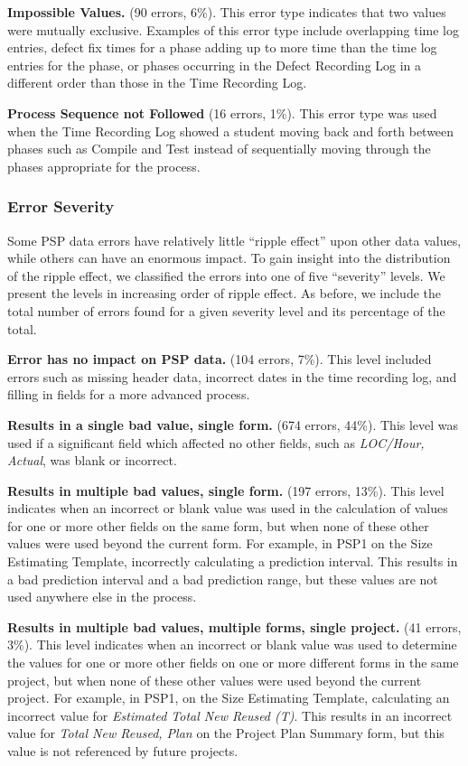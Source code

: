 {\bf Impossible Values.} (90 errors, 6\%). This error type indicates that
two values were mutually exclusive.  Examples of this error type include
overlapping time log entries, defect fix times for a phase adding up to
more time than the time log entries for the phase, or phases occurring in
the Defect Recording Log in a different order than those in the Time
Recording Log.
      
{\bf Process Sequence not Followed} (16 errors, 1\%).  This error type was
used when the Time Recording Log showed a student moving back and forth
between phases such as Compile and Test instead of sequentially moving
through the phases appropriate for the process.\newline


\subsubsection{Error Severity}

Some PSP data errors have relatively little ``ripple effect'' upon other
data values, while others can have an enormous impact. To gain insight into
the distribution of the ripple effect, we classified the errors into one of
five ``severity'' levels.  We present the levels in increasing order
of ripple effect.  As before, we include the total number of errors
found for a given severity level and its percentage of the total.


{\bf Error has no impact on PSP data.} (104 errors, 7\%). This level
included errors such as missing header data, incorrect dates in the time
recording log, and filling in fields for a more advanced process.
        
{\bf Results in a single bad value, single form.} (674 errors, 44\%).  This
level was used if a significant field which affected no other fields, such
as {\it LOC/Hour, Actual}, was blank or incorrect.
        
{\bf Results in multiple bad values, single form.} (197 errors, 13\%).
This level indicates when an incorrect or blank value was used in the
calculation of values for one or more other fields on the same form, but
when none of these other values were used beyond the current form.  For
example, in PSP1 on the Size Estimating Template, incorrectly calculating a
prediction interval.  This results in a bad prediction interval and a bad
prediction range, but these values are not used anywhere else in the
process.
        
{\bf Results in multiple bad values, multiple forms, single project.} (41
errors, 3\%).  This level indicates when an incorrect or blank value was
used to determine the values for one or more other fields on one or more
different forms in the same project, but when none of these other values
were used beyond the current project.  For example, in PSP1, on the Size
Estimating Template, calculating an incorrect value for {\it Estimated
  Total New Reused (T)}.  This results in an incorrect value for {\it Total
  New Reused, Plan} on the Project Plan Summary form, but this value is not
referenced by future projects.
        
